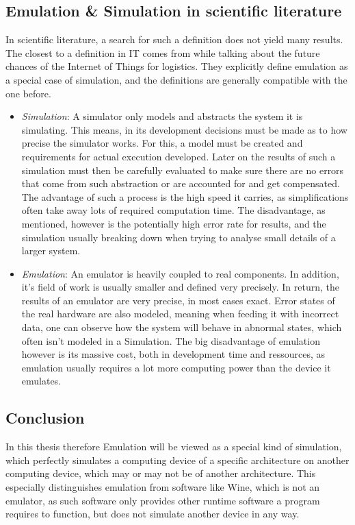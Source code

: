 \subsection{Emulation \& Simulation in scientific literature}
In scientific literature, a search for such a definition does not yield many results.
The closest to a definition in IT comes from 
while talking about the future chances of the Internet of Things for logistics\cite{definition_iot}.
They explicitly define emulation as a special case of simulation,
and the definitions are generally compatible with the one before.
\begin{itemize}
    \item \emph{Simulation}: A simulator only models and abstracts the system it is simulating.
    This means, in its development decisions must be made as to how precise the simulator works.
    For this, a model must be created and requirements for actual execution developed.
    Later on the results of such a simulation must then be carefully evaluated to make sure
    there are no errors that come from such abstraction
    or are accounted for and get compensated.
    The advantage of such a process is the high speed it carries,
    as simplifications often take away lots of required computation time.
    The disadvantage, as mentioned, however is the potentially high error rate for results,
    and the simulation usually breaking down when trying to analyse small details of a larger system\cite{definition_iot}.
    \item \emph{Emulation}: An emulator is heavily coupled to real components.
    In addition, it's field of work is usually smaller and defined very precisely.
    In return, the results of an emulator are very precise, in most cases exact.
    Error states of the real hardware are also modeled, meaning when feeding it with incorrect data,
    one can observe how the system will behave in abnormal states, which often isn't modeled in a Simulation.
    The big disadvantage of emulation however is its massive cost,
    both in development time and ressources,
    as emulation usually requires a lot more computing power than the device it emulates\cite{definition_iot}.
\end{itemize}

\subsection{Conclusion}\label{sec:conclusion_emulation}
In this thesis therefore Emulation will be viewed as a special kind of simulation,
which perfectly simulates a computing device of a specific architecture
on another computing device, which may or may not be of another architecture.
This especially distinguishes emulation from software like Wine, which is not an emulator,
as such software only provides other runtime software a program requires to function, but does not simulate another device in any way\cite{wine}.

